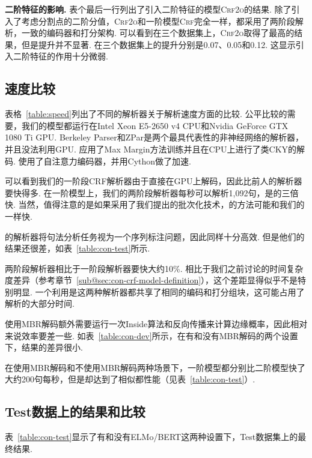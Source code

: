 \noindent\textbf{二阶特征的影响.}
表个最后一行列出了引入二阶特征的模型\textsc{Crf2o}的结果.
除了引入了考虑分割点的二阶分值，\textsc{Crf2o}和一阶模型\textsc{Crf}完全一样，都采用了两阶段解析，一致的编码器和打分架构.
可以看到在三个数据集上，\textsc{Crf2o}取得了最高的结果，但是提升并不显著.
在三个数据集上的提升分别是0.07、0.05和0.12.
这显示引入二阶特征的作用十分微弱.



\subsection{速度比较}
表格~\ref{table:speed}列出了不同的解析器关于解析速度方面的比较.
公平比较的需要，我们的模型都运行在Intel Xeon E5-2650 v4 CPU和Nvidia GeForce GTX 1080 Ti GPU.
Berkeley Parser和ZPar是两个最具代表性的非神经网络的解析器，并且没法利用GPU.
\citep{stern-etal-2017-minimal}应用了Max Margin方法训练并且在CPU上进行了类CKY的解码.
\citep{kitaev-klein-2018-constituency}使用了自注意力编码器，并用Cython做了加速.

可以看到我们的一阶段CRF解析器由于直接在GPU上解码，因此比前人的解析器要快得多.
在一阶模型上，我们的两阶段解析器每秒可以解析1,092句，是\citep{kitaev-klein-2018-constituency}的三倍快.
当然，值得注意的是如果采用了我们提出的批次化技术，\citep{stern-etal-2017-minimal,kitaev-klein-2018-constituency}的方法可能和我们的一样快.

\citep{gomez-rodriguez-vilares-2018-constituent}的解析器将句法分析任务视为一个序列标注问题，因此同样十分高效.
但是他们的结果还很差，如表~\ref{table:con-test}所示.

两阶段解析器相比于一阶段解析器要快大约10\%.
相比于我们之前讨论的时间复杂度差异（参考章节~\ref{sub@sec:con-crf-model-definition}），这个差距显得似乎不是特别明显.
一个利用是这两种解析器都共享了相同的编码和打分组块，这可能占用了解析的大部分时间.

使用MBR解码额外需要运行一次Inside算法和反向传播来计算边缘概率，因此相对来说效率要差一些.
如表~\ref{table:con-dev}所示，在有和没有MBR解码的两个设置下，结果的差异很小.

在使用MBR解码和不使用MBR解码两种场景下，一阶模型都分别比二阶模型快了大约200句每秒，但是却达到了相似都性能（见表~\ref{table:con-test}）.



\subsection{Test数据上的结果和比较}
表~\ref{table:con-test}显示了有和没有ELMo/BERT这两种设置下，Test数据集上的最终结果.

